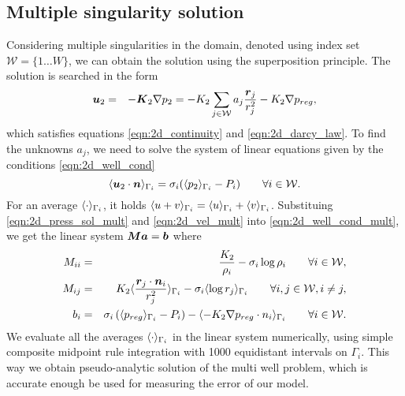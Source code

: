   \subsection{Multiple singularity solution}
  Considering multiple singularities in the domain, denoted using index set $\mathcal{W}=\{1\ldots W\}$, we can obtain the solution using the superposition principle.
  The solution is searched in the form
  \begin{eqnarray}
    \mathbf{\boldsymbol{u}}_2 &=& -\mathbf{\boldsymbol{K}}_2\nabla p_2 = -K_2 \sum\limits_{j\in\mathcal{W}} a_j\frac{\mathbf{\boldsymbol{r}}_j}{r_j^2} - K_2 \nabla p_{reg}, \label{eqn:2d_vel_mult}
  \end{eqnarray}
  which satisfies equations \eqref{eqn:2d_continuity} and \eqref{eqn:2d_darcy_law}.
  To find the unknowns $a_j$, we need to solve the system of linear equations given by the conditions \eqref{eqn:2d_well_cond}
  \begin{equation}
    \langle\mathbf{\boldsymbol{u}}_2 \cdot \mathbf{\boldsymbol{n}}\rangle_{\Gamma_i} = \sigma_i (\langle p_2\rangle_{\Gamma_i} - P_i) \qquad  \forall i\in\mathcal{W}. \label{eqn:2d_well_cond_mult}
  \end{equation}
  For an average $\langle\cdot\rangle_{\Gamma_i}$, it holds $\langle u+v\rangle_{\Gamma_i} = \langle u\rangle_{\Gamma_i} + \langle v\rangle_{\Gamma_i}$.
  Substituing \eqref{eqn:2d_press_sol_mult} and \eqref{eqn:2d_vel_mult} into \eqref{eqn:2d_well_cond_mult}, we get
  the linear system $\mathbf{\boldsymbol{M}}\mathbf{\boldsymbol{a}} = \mathbf{\boldsymbol{b}}$ where
  \begin{eqnarray}
    M_{ii} &=& \frac{K_2}{\rho_i} - \sigma_i\log\rho_i \qquad \forall i\in\mathcal{W},\\
    M_{ij} &=& K_2\langle\frac{\mathbf{\boldsymbol{r}}_j \cdot \mathbf{\boldsymbol{n}}_i}{r_j^2}\rangle_{\Gamma_i} - \sigma_i\langle\log r_j\rangle_{\Gamma_i} \qquad \forall i,j\in\mathcal{W}, i\neq j,\\
    b_{i} &=& \sigma_i\left(\langle p_{reg}\rangle_{\Gamma_i} - P_i \right) - \langle- K_2 \nabla p_{reg}\cdot n_i\rangle_{\Gamma_i} \qquad \forall i\in\mathcal{W}.
  \end{eqnarray}
  We evaluate all the averages $\langle\cdot\rangle_{\Gamma_i}$ in the linear system numerically,
  using simple composite midpoint rule integration with 1000 equidistant intervals on $\Gamma_i$.
  This way we obtain pseudo-analytic solution of the multi well problem, which is accurate enough
  be used for measuring the error of our model.
